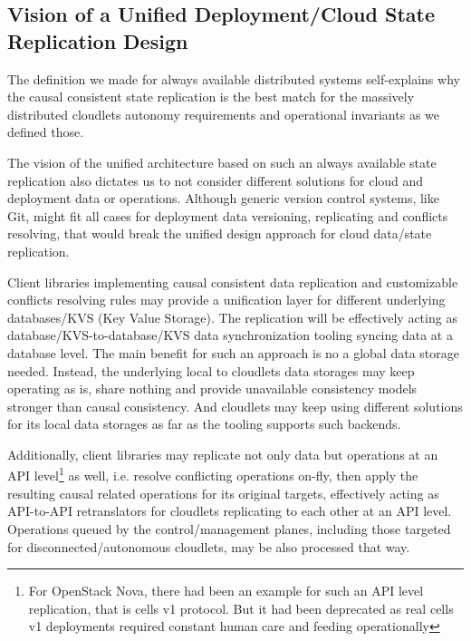 \documentclass[conference]{IEEEtran}
\begin{document}
\subsection{Vision of a Unified Deployment/Cloud State Replication Design}

The definition we made for always available distributed systems self-explains
why the causal consistent state replication is the best match for the
massively distributed cloudlets autonomy requirements and operational
invariants as we defined those.

The vision of the unified architecture based on such an always available state
replication also dictates us to not consider different solutions for cloud and
deployment data or operations. Although generic version control systems, like
Git, might fit all cases for deployment data versioning, replicating and
conflicts resolving, that would break the unified design approach for cloud
data/state replication.

Client libraries implementing causal consistent data replication and
customizable conflicts resolving rules may provide a unification layer for
different underlying databases/KVS (Key Value Storage). The replication will be
effectively acting as database/KVS-to-database/KVS data synchronization tooling
syncing data at a database level. The main benefit for such an approach is no a
global data storage needed. Instead, the underlying local to cloudlets data
storages may keep operating as is, share nothing and provide unavailable
consistency models stronger than causal consistency. And cloudlets may keep
using different solutions for its local data storages as far as the tooling
supports such backends.

Additionally, client libraries may replicate not only data but operations at an
API level\footnote{For OpenStack Nova, there had been an example for such an
API level replication, that is cells v1 protocol. But it had been deprecated as
real cells v1 deployments required constant human care and feeding
operationally} as well, i.e. resolve conflicting operations on-fly, then apply
the resulting causal related operations for its original targets, effectively
acting as API-to-API retranslators for cloudlets replicating to each other at
an API level. Operations queued by the control/management planes, including
those targeted for disconnected/autonomous cloudlets, may be also processed
that way.
\end{document}
